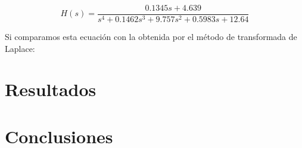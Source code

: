 \documentclass{article}
\begin{document}
\begin{enumerate}
\begin{equation*}
  H(s) = \frac{0.1345s + 4.639}{s^4+0.1462s^3+9.757s^2+0.5983s+12.64} 
\end{equation*}

Si comparamos esta ecuación con la obtenida por el método de transformada de Laplace:
  

\end{enumerate}



\section{Resultados}
\lipsum[1-3] \cite{sternberg2010dynamical}

\section{Conclusiones}
\lipsum[1-2] \cite{chatterjee2021covid}

\printbibliography[heading=bibintoc]
\end{document}
